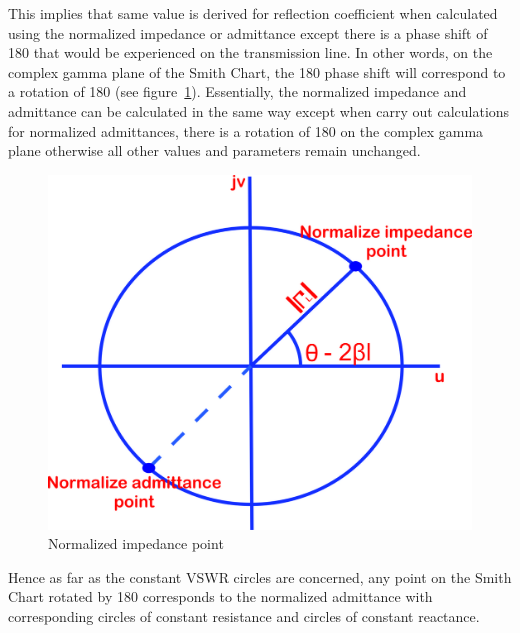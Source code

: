 This implies that same value is derived for reflection coefficient when calculated using the normalized impedance or admittance except there is a phase shift of 180\textdegree\; that would be experienced on the transmission line. In other words, on the complex gamma plane of the Smith Chart, the 180\textdegree\; phase shift will correspond to a rotation of 180\textdegree\; (see figure~\ref{fig:zstyuiou}). Essentially, the normalized impedance and admittance can be calculated in the same way except when carry out calculations for normalized admittances, there is a rotation of 180\textdegree\; on the complex gamma plane otherwise all other values and parameters remain unchanged.
\begin{figure}[h]
\centering
\includegraphics[width=0.6\linewidth]{./graphics/zstyuiou}
\caption{Normalized impedance point}
\label{fig:zstyuiou}
\end{figure}

Hence as far as the constant VSWR circles are concerned, any point on the Smith Chart rotated by 180\textdegree\; corresponds to the normalized admittance with corresponding circles of constant resistance and circles of constant reactance. 

